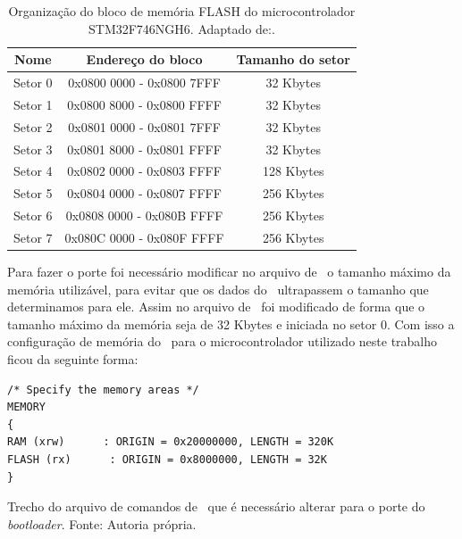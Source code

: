 \begin{table}[H]
    \scriptsize
    \centering
    \begin{tabular}{|c|c|c|}

    \hline
    Nome    & Endereço do bloco         & Tamanho do setor \\ \hline
    Setor 0 & 0x0800 0000 - 0x0800 7FFF & 32 Kbytes        \\ \hline
    Setor 1 & 0x0800 8000 - 0x0800 FFFF & 32 Kbytes        \\ \hline
    Setor 2 & 0x0801 0000 - 0x0801 7FFF & 32 Kbytes        \\ \hline
    Setor 3 & 0x0801 8000 - 0x0801 FFFF & 32 Kbytes        \\ \hline
    Setor 4 & 0x0802 0000 - 0x0803 FFFF & 128 Kbytes       \\ \hline
    Setor 5 & 0x0804 0000 - 0x0807 FFFF & 256 Kbytes       \\ \hline
    Setor 6 & 0x0808 0000 - 0x080B FFFF & 256 Kbytes       \\ \hline
    Setor 7 & 0x080C 0000 - 0x080F FFFF & 256 Kbytes       \\ \hline
    \end{tabular}
    \caption{Organização do bloco de memória FLASH do microcontrolador STM32F746NGH6. \newline Adaptado de:\cite{STM32F7}.}
    \label{STM32F7_FLASH}
    \end{table}


Para fazer o porte foi necessário modificar no arquivo de \linker\ o tamanho máximo da memória utilizável, para evitar que os dados do \bootloader\ ultrapassem o tamanho que determinamos para ele. Assim no arquivo de \linker\ foi modificado de forma que o tamanho máximo da memória seja de 32 Kbytes e iniciada no setor 0. Com isso a configuração de memória do \bootloader\ para o microcontrolador utilizado neste trabalho ficou da seguinte forma:


\begin{algorithm}[H]
\begin{lstlisting}
/* Specify the memory areas */
MEMORY
{
RAM (xrw)      : ORIGIN = 0x20000000, LENGTH = 320K
FLASH (rx)      : ORIGIN = 0x8000000, LENGTH = 32K
}

\end{lstlisting}
\caption{Trecho do arquivo de comandos de \linker\ que é necessário alterar para o porte do \textit{bootloader}.
\newline Fonte: Autoria própria.}
\end{algorithm}

